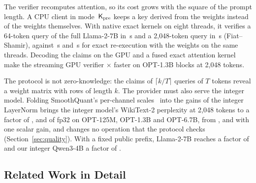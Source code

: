  The verifier recomputes attention, so its cost grows with the square of the
prompt length. A CPU client in mode~$\mathsf{K}_{\mathrm{pre}}$ keeps a key derived from the weights instead of the
weights themselves. With native exact kernels on eight threads, it verifies a 64-token query of the
full Llama-2-7B in \CpuVerifyShort{}\,s and a 2{,}048-token query in \CpuVerifyLong{}\,s
(Fiat--Shamir), against \CpuReexecShort{}\,s and \CpuReexecLong{}\,s for exact re-execution with the
weights on the same threads. Decoding the claims on the GPU and a fused exact attention kernel make
the streaming GPU verifier \ImproveGpuvOptM{}$\times$ faster on OPT-1.3B blocks at 2{,}048 tokens.

 The protocol is not zero-knowledge: the claims of $\lceil k/T\rceil$
queries of $T$ tokens reveal a weight matrix with rows of length $k$. The provider must also serve
the integer model. Folding SmoothQuant's per-channel scales~\cite{xiao2023smoothquant} into the
gains of the integer LayerNorm brings the integer model's WikiText-2 perplexity at 2{,}048 tokens to
a factor of \QualityRatioOptS{}, \QualityRatioOptM{} and \QualityRatioOptL{} of fp32 on
OPT-125M, OPT-1.3B and OPT-6.7B, from \QualityScalarOptS{}, \QualityScalarOptM{} and
\QualityScalarOptL{} with one scalar gain, and changes no operation that the protocol checks
(Section~\ref{sec:quality}). With a fixed public prefix, Llama-2-7B reaches a factor of
\LlamaSevenRatio{} and our integer Qwen3-4B a factor of \QwenLRatio{}.

\subsection{Related Work in Detail}
\label{ext:related}

